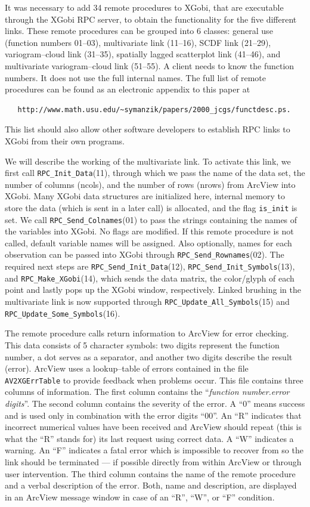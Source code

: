 It was necessary to add 34 remote procedures to XGobi, that are
executable through the XGobi RPC server, to obtain the functionality
for the five different links.  These remote procedures
can be grouped into 6 classes: general use
(function numbers 01--03), multivariate link (11--16), SCDF
link (21--29), variogram--cloud link (31--35), spatially lagged
scatterplot link (41--46), and multivariate variogram--cloud link 
(51--55).  A client needs to know the function numbers.
It does not use
the full internal names. The full list of remote procedures can be
found as an electronic appendix to this paper at 
\begin{verbatim}
   http://www.math.usu.edu/~symanzik/papers/2000_jcgs/functdesc.ps.
\end{verbatim}
This list should also allow other software developers to establish
RPC links to XGobi from their own programs. 

We will describe the working of the multivariate link. To activate
this link, we first call
\verb#RPC_Init_Data#(11), through which we pass the name of the data
set, the number of columns (ncols), and the number of rows (nrows)
from ArcView into XGobi. Many XGobi data structures are initialized
here, internal memory to store the data (which is sent in a later
call) is allocated, and the flag \verb#is_init# is set. We call
\verb#RPC_Send_Colnames#(01) to pass the strings containing the names
of the variables into XGobi. No flags are modified. If this remote
procedure is not called, default variable names will be assigned. Also
optionally, names for each observation can be passed into XGobi
through \verb#RPC_Send_Rownames#(02). The required next steps are
\verb#RPC_Send_Init_Data#(12), \verb#RPC_Send_Init_Symbols#(13),
and \verb#RPC_Make_XGobi#(14), which sends the data matrix, the
color/glyph of each point and lastly pops up the XGobi window,
respectively. Linked
brushing in the multivariate link is now supported
through \verb#RPC_Update_All_Symbols#(15) and
\verb#RPC_Update_Some_Symbols#(16).

The remote procedure calls return information to ArcView 
for error checking. This data
consists of 5 character symbols: two digits represent the function
number, a dot serves as a separator, and another two digits describe the
result (error). ArcView uses a lookup--table of errors contained
in the file {\tt AV2XGErrTable} to provide feedback when
problems occur. This file
contains three columns of information. The first column
contains the ``{\it function number.error digits}''.  The second
column contains the severity of the error. A ``0'' means success and
is used only in combination with the error digits ``00''.  An ``R''
indicates that incorrect numerical values have been received and
ArcView should repeat (this is what the ``R'' stands for) its last
request using correct data.  A ``W'' indicates a warning. An ``F''
indicates a fatal error which is impossible to recover from so
the link should be terminated --- if possible directly from within
ArcView or through user intervention.
The third column contains the name of the remote procedure and a
verbal description of the error. 
Both, name and description, are  displayed in an ArcView
message window in case of an ``R'', ``W'', or ``F'' condition.

